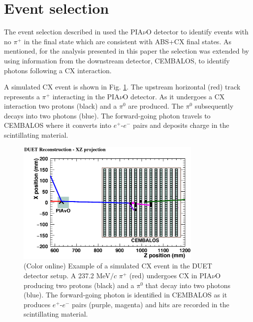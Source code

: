 \section{\label{sec:selection}Event selection}
The event selection described in \cite{duet} used the PIA$\nu$O detector to identify events with no $\pi^{+}$ in the final state which are consistent with ABS+CX final states. As mentioned, for the analysis presented in this paper the selection was extended by using information from the downstream detector, CEMBALOS, to identify photons following a CX interaction. 

A simulated CX event is shown in Fig. \ref{fig:event}. The upstream horizontal (red) track represents a $\pi^{+}$ interacting in the PIA$\nu$O detector. As it undergoes a CX interaction two protons (black) and a $\pi^{0}$ are produced. The $\pi^{0}$ subsequently decays into two photons (blue). The forward-going photon travels to CEMBALOS where it converts into $e^{+}$-$e^{-}$ pairs and deposits charge in the scintillating material.

\begin{figure}[ht]
\includegraphics[width=90mm]{figures/event_display_without_diagram.eps}
\caption{(Color online) Example of a simulated CX event in the DUET detector setup. A 237.2 MeV$/c$ $\pi^+$ (red) undergoes CX in PIA$\nu$O producing two protons (black) and a $\pi^0$ that decay into two photons (blue). The forward-going photon is identified in CEMBALOS as it produces $e^{+}$-$e^{-}$ pairs (purple, magenta) and hits are recorded in the scintillating material.}
\label{fig:event}
\end{figure}

